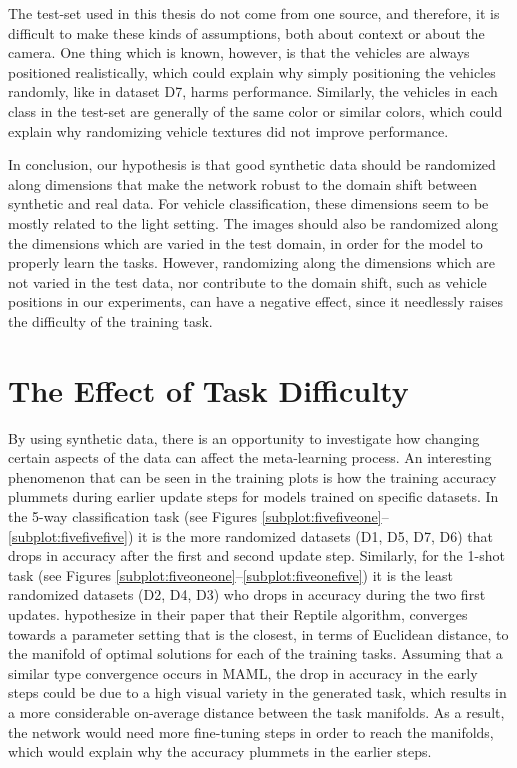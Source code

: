 The test-set used in this thesis do not come from one source, and therefore, it is difficult to make these kinds of assumptions, both about context or about the camera. One thing which is known, however, is that the vehicles are always positioned realistically, which could explain why simply positioning the vehicles randomly, like in dataset D7, harms performance. Similarly, the vehicles in each class in the test-set are generally of the same color or similar colors, which could explain why randomizing vehicle textures did not improve performance.

In conclusion, our hypothesis is that good synthetic data should be randomized along dimensions that make the network robust to the domain shift between synthetic and real data. For vehicle classification, these dimensions seem to be mostly related to the light setting. The images should also be randomized along the dimensions which are varied in the test domain, in order for the model to properly learn the tasks. However, randomizing along the dimensions which are not varied in the test data, nor contribute to the domain shift, such as vehicle positions in our experiments, can have a negative effect, since it needlessly raises the difficulty of the training task.

\section{The Effect of Task Difficulty}
By using synthetic data, there is an opportunity to investigate how changing certain aspects of the data can affect the meta-learning process. An interesting phenomenon that can be seen in the training plots is how the training accuracy plummets during earlier update steps for models trained on specific datasets. In the 5-way classification task (see Figures \ref{subplot:fivefiveone}--\ref{subplot:fivefivefive}) it is the more randomized datasets (D1, D5, D7, D6) that drops in accuracy after the first and second update step. Similarly, for the 1-shot task (see Figures \ref{subplot:fiveoneone}--\ref{subplot:fiveonefive}) it is the least randomized datasets (D2, D4, D3) who drops in accuracy during the two first updates. \textcite{reptile} hypothesize in their paper that their Reptile algorithm, converges towards a parameter setting that is the closest, in terms of Euclidean distance, to the manifold of optimal solutions for each of the training tasks. Assuming that a similar type convergence occurs in MAML, the drop in accuracy in the early steps could be due to a high visual variety in the generated task, which results in a more considerable on-average distance between the task manifolds. As a result, the network would need more fine-tuning steps in order to reach the manifolds, which would explain why the accuracy plummets in the earlier steps.

